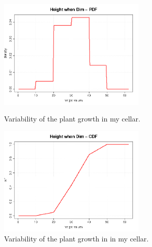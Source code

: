 \begin{figure}[H]
  \begin{minipage}{10cm}
    \begin{center}
      \includegraphics[width=7cm]{Height_PDF_WhenDim.png}
      \caption{Variability of the plant growth in my cellar.}
      \label{PDFHeightDim}
    \end{center}
  \end{minipage}
  \hfill
  \begin{minipage}{10cm}
    \begin{center}
      \includegraphics[width=7cm]{Height_CDF_WhenDim.png}
      \caption{Variability of the plant growth in in my cellar.}
      \label{CDFHeightDim}
    \end{center}
  \end{minipage}
\end{figure}


